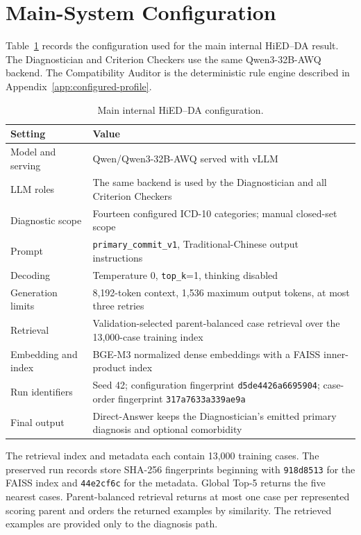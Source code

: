 \documentclass[12pt,a4paper,oneside]{report}
\begin{document}
\section{Main-System Configuration}
\label{sec:main-system-config}

Table~\ref{tab:main-system-config} records the configuration used for the
main internal HiED--DA result. The Diagnostician and Criterion Checkers
use the same Qwen3-32B-AWQ backend. The Compatibility Auditor is the
deterministic rule engine described in Appendix~\ref{app:configured-profile}.

\begin{table}[htbp]
\centering
\caption{Main internal HiED--DA configuration.}
\label{tab:main-system-config}
\small
\renewcommand{\arraystretch}{1.10}
\begin{tabularx}{\textwidth}{|p{4.3cm}|X|}
\hline
\textbf{Setting} & \textbf{Value}\\
\hline
Model and serving & Qwen/Qwen3-32B-AWQ served with vLLM\\
\hline
LLM roles & The same backend is used by the Diagnostician and all Criterion Checkers\\
\hline
Diagnostic scope & Fourteen configured ICD-10 categories; manual closed-set scope\\
\hline
Prompt & \texttt{primary\_commit\_v1}, Traditional-Chinese output instructions\\
\hline
Decoding & Temperature 0, \texttt{top\_k}=1, thinking disabled\\
\hline
Generation limits & 8,192-token context, 1,536 maximum output tokens, at most three retries\\
\hline
Retrieval & Validation-selected parent-balanced case retrieval over the 13,000-case training index\\
\hline
Embedding and index & BGE-M3 normalized dense embeddings with a FAISS inner-product index\\
\hline
Run identifiers & Seed 42; configuration fingerprint \texttt{d5de4426a6695904}; case-order fingerprint \texttt{317a7633a339ae9a}\\
\hline
Final output & Direct-Answer keeps the Diagnostician's emitted primary diagnosis and optional comorbidity\\
\hline
\end{tabularx}
\renewcommand{\arraystretch}{1.0}
\end{table}

The retrieval index and metadata each contain 13,000 training cases. The
preserved run records store SHA-256 fingerprints beginning with
\texttt{918d8513} for the FAISS index and \texttt{44e2cf6c} for the
metadata. Global Top-5 returns the five nearest cases. Parent-balanced
retrieval returns at most one case per represented scoring parent and
orders the returned examples by similarity. The retrieved examples are
provided only to the diagnosis path.
\end{document}
